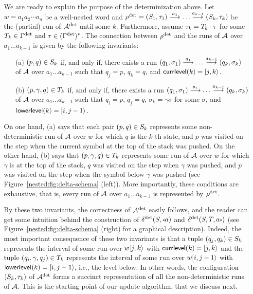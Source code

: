 We are ready to explain the purpose of the determinization above. Let $w = a_1 a_2 \cdots a_n$ be a well-nested word and $\rho^{\operatorname{det}} = (S_1, \tau_1) \overset{a_1}{\longrightarrow} \ldots \overset{a_{k-1}}{\longrightarrow} (S_k, \tau_k)$ be the (partial) run of $\mathcal{A}^{\operatorname{det}}$ until some $k$.
Furthermore, assume $\tau_k = T_k \cdot \tau$ for some $T_k \in \Gamma^{\operatorname{det}}$ and $\tau \in (\Gamma^{\operatorname{det}})^*$.  
The connection between $\rho^{\operatorname{det}}$ and the runs of $\mathcal{A}$ over $a_1\ldots a_{k-1}$ is given by the following invariants:
\begin{enumerate}
	\item[(a)] $(p,q) \in S_k$ if, and only if, there exists a run $(q_1, \sigma_1) \overset{a_1}{\longrightarrow} \ldots \overset{a_{k-1}}{\longrightarrow} (q_k, \sigma_k)$ of $\mathcal{A}$ over $a_1 \ldots a_{k-1}$ such that $q_j = p$, $q_k=q$, and ${\sf currlevel}(k) = [j,k\rangle$. 
	\item[(b)] $(p,\gamma, q) \in T_k$ if, and only if, there exists a run $(q_1, \sigma_1) \overset{a_1}{\longrightarrow} \ldots \overset{a_{k-1}}{\longrightarrow} (q_k, \sigma_k)$ of $\mathcal{A}$ over $a_1 \ldots a_{k-1}$ such that $q_i = p$, $q_j=q$, $\sigma_k = \gamma \sigma$ for some $\sigma$, and ${\sf lowerlevel}(k) = [i,j-1\rangle$. 
\end{enumerate}
On one hand, (a) says that each pair $(p,q)\in S_k$ represents some non-deterministic run of $\mathcal{A}$ over $w$ for which $q$ is the $k$-th state, and $p$ was visited on the step when the current symbol at the top of the stack was pushed. On the other hand, (b) says that $(p,\gamma,q)\in T_k$ represents some run of $\mathcal{A}$ over $w$ for which $\gamma$ is at the top of the stack, $q$ was visited on the step when $\gamma$ was pushed, and $p$ was visited on the step when the symbol below $\gamma$ was pushed (see Figure~\ref{nested:fig:delta-schema} (left)). More importantly, these conditions are exhaustive, that is, every run of $\mathcal{A}$ over $a_1 \ldots a_{k-1}$ is represented by $\rho^{\operatorname{det}}$. 



By these two invariants, the correctness of $\mathcal{A}^{\operatorname{det}}$ easily follows, and the reader can get some intuition behind the construction of $\delta^{\operatorname{det}}(S,{\scriptsize\texttt{<}} a)$ and $\delta^{\operatorname{det}}(S,T,a{\scriptsize\texttt{>}})$ (see Figure~\ref{nested:fig:delta-schema} (right) for a graphical description). 
Indeed, the most important consequence of these two invariants is that a tuple $(q_j,q_k) \in S_k$ represents the interval of some run over $w[j,k\rangle$ with ${\sf currlevel}(k) = [j,k\rangle$ and the tuple $(q_i, \gamma, q_j) \in T_k$ represents the interval of some run over $w[i,j-1\rangle$ with ${\sf lowerlevel}(k) = [i,j-1\rangle$, i.e., the level below. 
In other words, the configuration $(S_k, \tau_k)$ of $\mathcal{A}^{\operatorname{det}}$ forms a succinct representation of all the non-deterministic runs of $\mathcal{A}$. This is the starting point of our update algorithm, that we discuss next.
\smallskip

